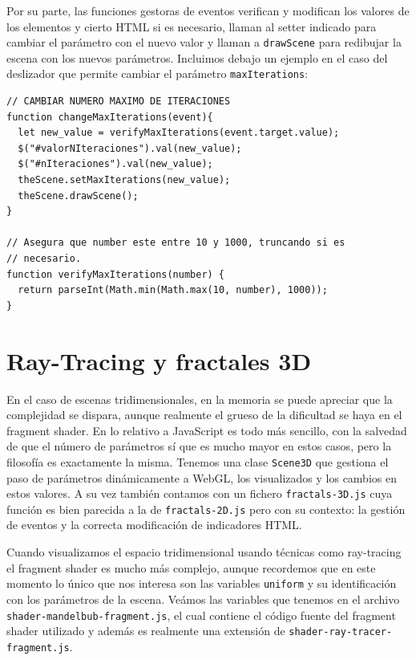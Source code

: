 Por su parte, las funciones gestoras de eventos verifican y modifican los valores de los elementos y cierto HTML si es necesario, llaman al setter indicado para cambiar el parámetro con el nuevo valor y llaman a \verb|drawScene| para redibujar la escena con los nuevos parámetros. Incluimos debajo un ejemplo en el caso del deslizador que permite cambiar el parámetro \verb|maxIterations|:

\begin{lstlisting}
// CAMBIAR NUMERO MAXIMO DE ITERACIONES
function changeMaxIterations(event){
  let new_value = verifyMaxIterations(event.target.value);
  $("#valorNIteraciones").val(new_value);
  $("#nIteraciones").val(new_value);
  theScene.setMaxIterations(new_value);
  theScene.drawScene();
}

// Asegura que number este entre 10 y 1000, truncando si es
// necesario.
function verifyMaxIterations(number) {
  return parseInt(Math.min(Math.max(10, number), 1000));
}
\end{lstlisting}

\section{Ray-Tracing y fractales 3D}

En el caso de escenas tridimensionales, en la memoria se puede apreciar que la complejidad se dispara, aunque realmente el grueso de la dificultad se haya en el fragment shader. En lo relativo a JavaScript es todo más sencillo, con la salvedad de que el número de parámetros sí que es mucho mayor en estos casos, pero la filosofía es exactamente la misma. Tenemos una clase \verb|Scene3D| que gestiona el paso de parámetros dinámicamente a WebGL, los visualizados y los cambios en estos valores. A su vez también contamos con un fichero \verb|fractals-3D.js| cuya función es bien parecida a la de \verb|fractals-2D.js| pero con su contexto: la gestión de eventos y la correcta modificación de indicadores HTML.

Cuando visualizamos el espacio tridimensional usando técnicas como ray-tracing el fragment shader es mucho más complejo, aunque recordemos que en este momento lo único que nos interesa son las variables \verb|uniform| y su identificación con los parámetros de la escena. Veámos las variables que tenemos en el archivo \verb|shader-mandelbub-fragment.js|, el cual contiene el código fuente del fragment shader utilizado y además es realmente una extensión de \verb|shader-ray-tracer-fragment.js|.

